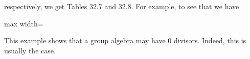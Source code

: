 \documentclass[11pt,oneside]{article}
\begin{document}
\begin{BookBody}
\noindent respectively, we get Tables 32.7 and 32.8. For example, to see that  we have

\begin{center}\begin{adjustbox}{max width=\linewidth}\end{adjustbox}\end{center}

\noindent This example shows that a group algebra may have 0 divisors. Indeed, this is usually the case. \BookEnd{\blacktriangle}

\end{BookBody}

\BookNarrativetrue
\end{document}
